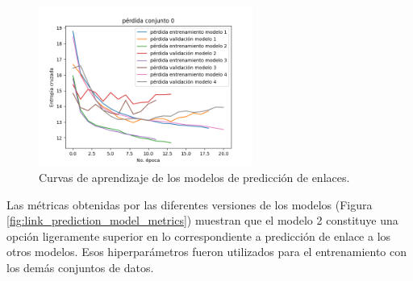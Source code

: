 \documentclass[a4paper,11pt,twocolumn,twoside]{article}
\begin{document}
\begin{figure}[h]
	\centering
	\includegraphics[width=7cm,clip]{Graphics/persuassive_essays_all_linked_link_prediction_loss_model_1.png}
	\caption{Curvas de aprendizaje de los modelos de predicción de enlaces.}
	\label{fig:link_prediction_model_loss}
\end{figure}

Las métricas obtenidas por las diferentes versiones de los modelos 
(Figura \ref{fig:link_prediction_model_metrics}) 
muestran que el modelo 2 constituye una opción ligeramente superior en lo correspondiente a 
predicción de enlace a los otros modelos. Esos hiperparámetros
fueron utilizados para el entrenamiento con los demás conjuntos de datos.
\end{document}
